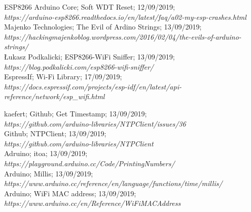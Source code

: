 \documentclass{report}
\begin{document}
\begin{thebibliography}{9}
        ESP8266 Arduino Core; Soft WDT Reset; 12/09/2019; \\
        \textit{https://arduino-esp8266.readthedocs.io/en/latest/faq/a02-my-esp-crashes.html} \\
        
        Majenko Technologies; The Evil of Ardino Strings; 13/09/2019; \\
        \textit{https://hackingmajenkoblog.wordpress.com/2016/02/04/the-evils-of-arduino-strings/}\\
        
        Łukasz Podkalicki; ESP8266-WiFi Sniffer; 13/09/2019; \\
        \textit{https://blog.podkalicki.com/esp8266-wifi-sniffer/} \\
        
        EspressIf;  Wi-Fi Library; 17/09/2019;\\
        \textit{https://docs.espressif.com/projects/esp-idf/en/latest/api-reference/network/esp_wifi.html}
        
        kaefert; Github; Get Timestamp; 13/09/2019;\\
        \textit{https://github.com/arduino-libraries/NTPClient/issues/36} \\

        Github; NTPClient; 13/09/2019; \\ 
        \textit{https://github.com/arduino-libraries/NTPClient} \\
        
        Adruino; itoa; 13/09/2019; \\
        \textit{https://playground.arduino.cc/Code/PrintingNumbers/} \\
        
        Arduino; Millis; 13/09/2019; \\
        \textit{https://www.arduino.cc/reference/en/language/functions/time/millis/} \\
        
        Arduino; WiFi MAC address; 13/09/2019; \\
        \textit{https://www.arduino.cc/en/Reference/WiFiMACAddress} \\
        

\end{thebibliography}
\end{document}
